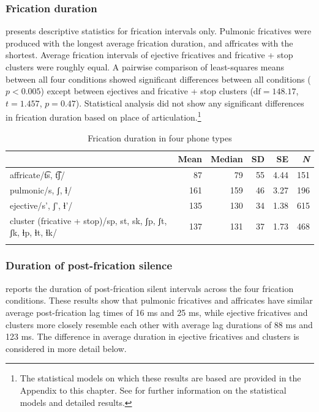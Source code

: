 \documentclass[output=paper,colorlinks,citecolor=brown]{langscibook}
\begin{document}
\subsubsection{Frication duration}
 presents descriptive statistics for frication intervals only. Pulmonic fricatives were produced with the longest average frication duration, and affricates with the shortest. Average frication intervals of ejective fricatives and fricative + stop clusters were roughly equal. A pairwise comparison of least-squares means between all four conditions showed significant differences between all conditions ($p < 0.005$) except between ejectives and fricative + stop clusters ($\text{df} = 148.17$, $t = 1.457$, $p = 0.47$). Statistical analysis did not show any significant differences in frication duration based on place of articulation.\footnote{The statistical models on which these results are based are provided in the Appendix to this chapter. See \citet{Puderbaugh2019a} for further information on the statistical models and detailed results.}

\begin{table} 
	\caption[Frication duration in milliseconds of four phone types]{Frication duration in four phone types}
	\label{tab:fdursummary}

	\begin{tabularx}{\textwidth}{Q rrrrr}
		\lspbottomrule
		&{Mean}&{Median}&{SD}&{SE}&{\textit{N}}\\
		\midrule
		affricate\newline /t͡s, t͡ʃ/ &87 &79 &55 &4.44&151\\
		\tablevspace
		pulmonic\newline /s, ʃ, ɬ/&161 &159 &46 &3.27&196\\
		\tablevspace
		ejective\newline /s', ʃ', {ɬ}'/ &135 &130 &34 &1.38&615\\
		\tablevspace
		cluster (fricative + stop)\newline /sp, st, sk, ʃp, ʃt, ʃk, ɬp, ɬt, ɬk/ &137 &131 &37 &1.73&468\\
		\lspbottomrule
	\end{tabularx}
\end{table}

\subsubsection{Duration of post-frication silence}

 reports the duration of post-frication silent intervals across the four frication conditions. These results show that pulmonic fricatives and affricates have similar average post-frication lag times of 16 ms and 25 ms, while ejective fricatives and clusters more closely resemble each other with average lag durations of 88 ms and 123 ms. The difference in average duration in ejective fricatives and clusters is considered in more detail below.
\end{document}
